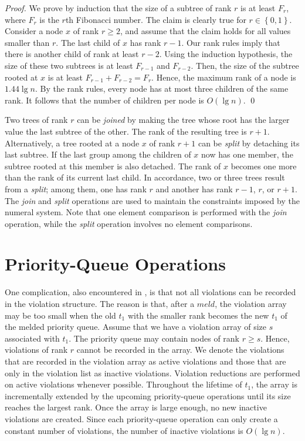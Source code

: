 \documentclass{llncs}
\newcommand{\set}[1]{\left\{#1\right\}}
\newcommand{\Meld}{\mbox{$\mathit{meld}$}}
\begin{document}
\begin{proof}
We prove by induction that the size of a subtree of rank $r$ is at
least $F_r$, where $F_r$ is the $r$th Fibonacci number. The claim
is clearly true for $r\in\set{0,1}$.  Consider a node $x$ of rank $r
\geq 2$, and assume that the claim holds for all values smaller than
$r$. The last child of $x$ has rank $r-1$. Our rank rules imply
that there is another child of rank at least $r-2$. Using the
induction hypothesis, the size of these two subtrees is at least
$F_{r-1}$ and $F_{r-2}$.  Then, the size of the subtree rooted
at $x$ is at least $F_{r-1} + F_{r-2} = F_r$.  
Hence, the maximum rank of a node is $1.44 \lg n$. 
By the rank rules, every node has at most three children of the same rank. 
It follows that the number of children per node is $O(\lg n)$.
\qed
\end{proof}

Two trees of rank $r$ can be \emph{joined} by making the tree whose
root has the larger value the last subtree of the other. The rank of
the resulting tree is $r+1$.  Alternatively, a tree rooted at a node
$x$ of rank $r+1$ can be \emph{split} by detaching its last subtree.
If the last group among the children of $x$ now has one member, the
subtree rooted at this member is also detached.  The rank of $x$
becomes one more than the rank of its current last child. In
accordance, two or three trees result from a {\it split}; among them, one
has rank $r$ and another has rank $r-1$, $r$, or $r+1$.  The {\it join} and
{\it split} operations are used to maintain the constraints imposed by the
numeral system.  Note that one element comparison is performed with
the {\it join} operation, while the {\it split} operation involves no element
comparisons.


\section{Priority-Queue Operations}

One complication, also encountered in \cite{Bro96}, 
is that not all violations can be recorded in the violation structure.
The reason is that, after a \Meld{}, the violation array may be 
too small when the old $t_1$ with the
smaller rank becomes the new $t_1$ of the melded priority queue.
Assume that we have a violation array of size $s$ associated with
$t_1$.  The priority queue may contain nodes of rank $r \geq s$.
Hence, violations of rank $r$ cannot be recorded in the
array.  We denote the violations that are recorded in the violation
array as active violations and those that are only in the
violation list as inactive violations.  Violation reductions
are performed on active violations whenever possible.  Throughout the
lifetime of $t_1$, the array is incrementally extended by the upcoming
priority-queue operations until its size reaches the largest rank.
Once the array is large enough, no new inactive violations are
created.  Since each priority-queue operation can only create a
constant number of violations, the number of inactive violations is
$O(\lg n)$.
\end{document}
